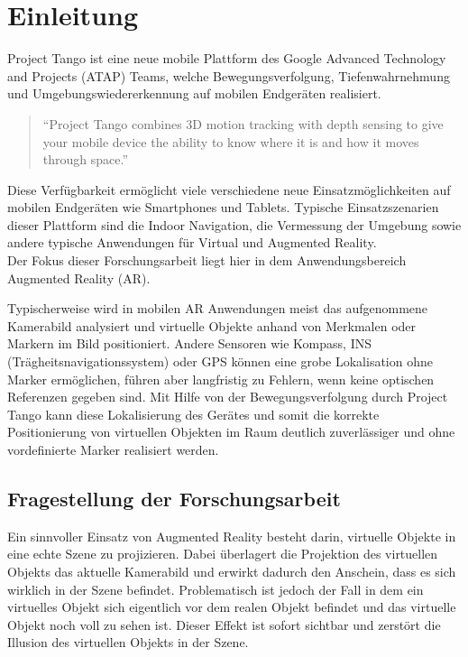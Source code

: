 \chapter{Einleitung}

Project Tango ist eine neue mobile Plattform des Google Advanced Technology and Projects (ATAP) Teams, welche Bewegungsverfolgung, Tiefenwahrnehmung und Umgebungswiedererkennung auf mobilen Endgeräten realisiert.

\begin{quotation}
\enquote{Project Tango combines 3D motion tracking with depth sensing to give your mobile device the ability to know where it is and how it moves through space.}  \citep{Proje19:online}
\end{quotation}

Diese Verfügbarkeit ermöglicht viele verschiedene neue Einsatzmöglichkeiten auf mobilen Endgeräten wie Smartphones und Tablets. Typische Einsatzszenarien dieser Plattform sind die Indoor Navigation, die Vermessung der Umgebung sowie andere typische Anwendungen für Virtual und Augmented Reality. \\

Der Fokus dieser Forschungsarbeit liegt hier in dem Anwendungsbereich Augmented Reality (AR). 


Typischerweise wird in mobilen AR Anwendungen meist das aufgenommene Kamerabild analysiert und virtuelle Objekte anhand von Merkmalen oder Markern im Bild positioniert. Andere Sensoren wie Kompass, INS (Trägheitsnavigationssystem) oder GPS können eine grobe Lokalisation ohne Marker ermöglichen, führen aber langfristig zu Fehlern, wenn keine optischen Referenzen gegeben sind. Mit Hilfe von der Bewegungsverfolgung durch Project Tango kann diese Lokalisierung des Gerätes und somit die korrekte Positionierung von virtuellen Objekten im Raum deutlich zuverlässiger und ohne vordefinierte Marker realisiert werden. 

\section{Fragestellung der Forschungsarbeit}

Ein sinnvoller Einsatz von Augmented Reality besteht darin, virtuelle Objekte in eine echte Szene zu projizieren. Dabei überlagert die Projektion des virtuellen Objekts das aktuelle Kamerabild und erwirkt dadurch den Anschein, dass es sich wirklich in der Szene befindet. Problematisch ist jedoch der Fall in dem ein virtuelles Objekt sich eigentlich vor dem realen Objekt befindet und das virtuelle Objekt noch voll zu sehen ist. Dieser Effekt ist sofort sichtbar und zerstört die Illusion des virtuellen Objekts in der Szene. \\

